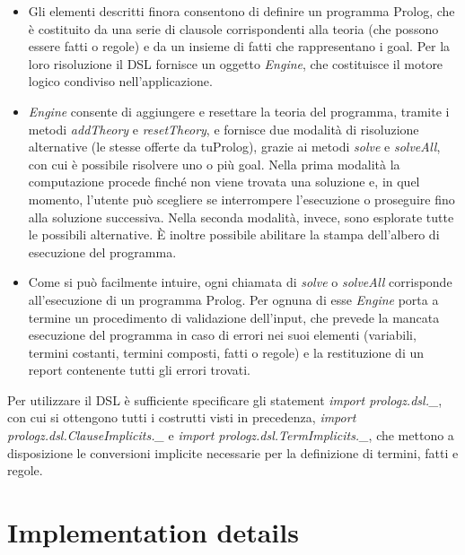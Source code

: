 \begin{itemize}

\item Gli elementi descritti finora consentono di definire un programma Prolog, che è costituito da una serie di clausole corrispondenti alla teoria (che possono essere fatti o regole) e da un insieme di fatti che rappresentano i goal. Per la loro risoluzione il DSL fornisce un oggetto \textit{Engine}, che costituisce il motore logico condiviso nell'applicazione.
\item \textit{Engine} consente di aggiungere e resettare la teoria del programma, tramite i metodi \textit{addTheory} e \textit{resetTheory}, e fornisce due modalità di risoluzione alternative (le stesse offerte da tuProlog), grazie ai metodi \textit{solve} e \textit{solveAll}, con cui è possibile risolvere uno o più goal. Nella prima modalità la computazione procede finché non viene trovata una soluzione e, in quel momento, l'utente può scegliere se interrompere l'esecuzione o proseguire fino alla soluzione successiva. Nella seconda modalità, invece, sono esplorate tutte le possibili alternative. È inoltre possibile abilitare la stampa dell'albero di esecuzione del programma.
\item Come si può facilmente intuire, ogni chiamata di \textit{solve} o \textit{solveAll} corrisponde all'esecuzione di un programma Prolog. Per ognuna di esse \textit{Engine} porta a termine un procedimento di validazione dell'input, che prevede la mancata esecuzione del programma in caso di errori nei suoi elementi (variabili, termini costanti, termini composti, fatti o regole) e la restituzione di un report contenente tutti gli errori trovati.
\end{itemize}

Per utilizzare il DSL è sufficiente specificare gli statement \textit{import prologz.dsl.\_}, con cui si ottengono tutti i costrutti visti in precedenza, \textit{import prologz.dsl.ClauseImplicits.\_} e \textit{import prologz.dsl.TermImplicits.\_}, che mettono a disposizione le conversioni implicite necessarie per la definizione di termini, fatti e regole.


\section{Implementation details}

